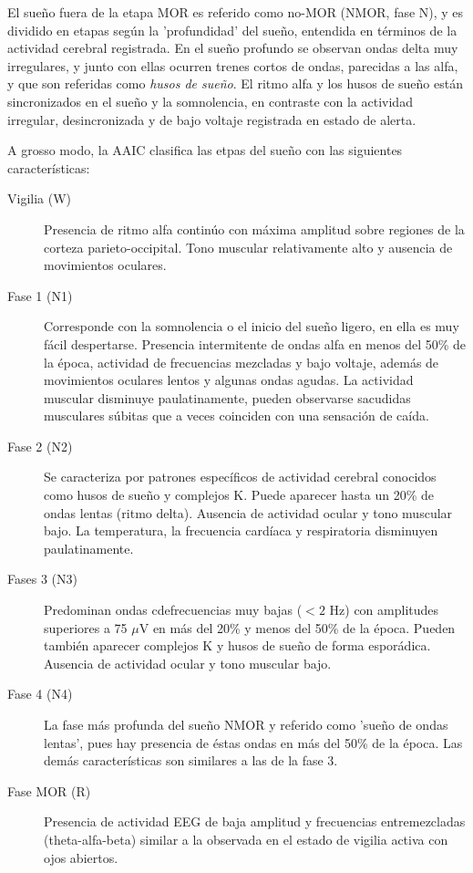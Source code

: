 \documentclass[12pt,a4paper]{mitthesis}
\begin{document}
El sue\~no fuera de la etapa MOR es referido como no-MOR (NMOR, fase N), y es dividido en etapas 
seg\'un la 'profundidad' del sue\~no, entendida en t\'erminos de la actividad cerebral registrada.
En el sue\~no profundo se observan ondas delta muy irregulares, y junto con ellas ocurren trenes 
cortos de ondas, parecidas a las alfa, y que son referidas como \textit{husos de sue\~no}. 
El ritmo alfa y los husos de sue\~no est\'an sincronizados en el sue\~no y la somnolencia, en 
contraste con la actividad irregular, desincronizada y de bajo voltaje registrada en estado de 
alerta.

A grosso modo, la AAIC clasifica las etpas del sue\~no \cite{Hori01} con las siguientes 
caracter\'isticas:

\begin{description}
\item[Vigilia (W)] Presencia de ritmo alfa contin\'uo con m\'axima amplitud sobre regiones de la 
corteza parieto-occipital. Tono muscular relativamente alto y ausencia de movimientos oculares.

\item[Fase 1 (N1)] Corresponde con la somnolencia o el inicio del sue\~no ligero, en ella es muy 
f\'acil despertarse. 
Presencia intermitente de ondas alfa en menos del 50\% de la \'epoca, actividad de frecuencias 
mezcladas y bajo voltaje, adem\'as de movimientos oculares lentos y algunas ondas agudas. 
La actividad muscular disminuye paulatinamente, pueden observarse sacudidas musculares s\'ubitas 
que a veces coinciden con una sensación de ca\'ida. 

\item[Fase 2 (N2)] Se caracteriza por patrones espec\'ificos de actividad cerebral conocidos como 
husos de sue\~no y complejos K. 
Puede aparecer hasta un 20\% de ondas lentas (ritmo delta). Ausencia de actividad 
ocular y tono muscular bajo.
La temperatura, la frecuencia card\'iaca y respiratoria disminuyen paulatinamente. 

\item[Fases 3 (N3)] Predominan ondas cdefrecuencias muy bajas ($<2$ Hz) con amplitudes 
superiores a 75 $\mu$V en m\'as del 20\% y menos del 50\% de la \'epoca. Pueden tambi\'en aparecer 
complejos K y husos de sue\~no de forma espor\'adica. Ausencia de actividad ocular y tono muscular 
bajo.

\item[Fase 4 (N4)] La fase m\'as profunda del sue\~no NMOR y referido como 'sue\~no de ondas 
lentas', pues hay presencia de \'estas ondas en m\'as del 50\% de la época. Las dem\'as 
caracter\'isticas son similares a las de la fase 3.

\item[Fase MOR (R)] Presencia de actividad EEG de baja amplitud y frecuencias entremezcladas 
(theta-alfa-beta) similar a la observada en el estado de vigilia activa con ojos abiertos.
\end{description}
\end{document}
